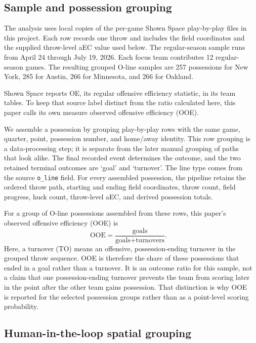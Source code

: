 \documentclass[11pt]{article}
\newcommand{\aEC}{aEC}
\newcommand{\Oline}{O-line}
\begin{document}
\subsection{Sample and possession grouping}

The analysis uses local copies of the per-game Shown Space play-by-play files in
this project. Each row records one throw and includes the field coordinates and
the supplied throw-level \aEC{} value used below. The regular-season sample runs
from April 24 through July 19, 2026. Each focus team contributes 12 regular-season
games. The resulting grouped \Oline{} samples are 257 possessions for New York,
285 for Austin, 266 for Minnesota, and 266 for Oakland.

Shown Space reports OE, its regular offensive efficiency statistic, in its team
tables. To keep that source label distinct from the ratio calculated here, this
paper calls its own measure observed offensive efficiency (OOE).

We assemble a possession by grouping play-by-play rows with the same game,
quarter, point, possession number, and home/away identity. This row grouping is a
data-processing step; it is separate from the later manual grouping of paths that
look alike. The final recorded event determines the outcome, and the two retained
terminal outcomes are `goal' and `turnover'. The line type comes from the source
\texttt{o\_line} field. For every assembled possession, the pipeline retains the
ordered throw path, starting and ending field coordinates, throw count, field
progress, huck count, throw-level \aEC{}, and derived possession
totals.

For a group of \Oline{} possessions assembled from these rows, this paper's
observed offensive efficiency (OOE) is
\[
  \mathrm{OOE} =
  \frac{\text{goals}}{\text{goals}+\text{turnovers}}.
\]
Here, a turnover (TO) means an offensive, possession-ending turnover in the
grouped throw sequence. OOE is therefore the share of these possessions that
ended in a goal rather than a turnover. It is an outcome ratio for this sample,
not a claim that one possession-ending turnover prevents the team from scoring
later in the point after the other team gains possession. That distinction is why
OOE is reported for the selected possession groups rather than as a point-level
scoring probability.

\subsection{Human-in-the-loop spatial grouping}
\end{document}
